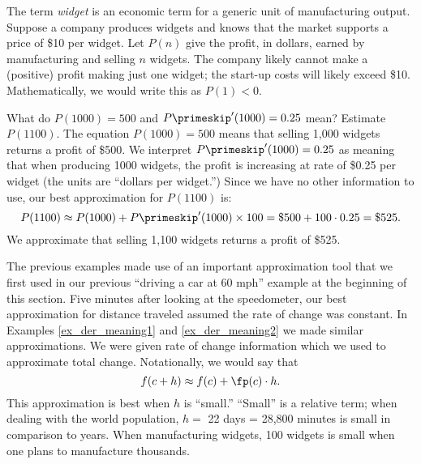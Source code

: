 \begin{example}\label{ex_der_meaning2}
The term \emph{widget} is an economic term for a generic unit of manufacturing output. Suppose a company produces widgets and knows that the market supports a price of \$10 per widget. Let $P(n)$ give the profit, in dollars, earned by manufacturing and selling $n$ widgets. The company likely cannot make a (positive) profit making just one widget; the start-up costs will likely exceed \$10. Mathematically, we would write this as $P(1) < 0$.

What do $P(1000) = 500$ and $P\primeskip'(1000)=0.25$ mean? Estimate $P(1100)$.
\solution
The equation $P(1000)=500$ means that selling 1,000 widgets returns a profit of \$500. We interpret $P\primeskip'(1000) = 0.25$ as meaning that when producing 1000 widgets, the profit is increasing at rate of \$0.25 per widget (the units are ``dollars per widget.'') Since we have no other information to use, our best approximation for $P(1100)$ is:
\[P(1100)\approx P(1000)+P\primeskip'(1000)\times100=\$500+100\cdot0.25=\$525.\]
We approximate that selling 1,100 widgets returns a profit of \$525.
\end{example}

The previous examples made use of an important approximation tool that we first used in our previous ``driving a car at 60 mph'' example at the beginning of this section. Five minutes after looking at the speedometer, our best approximation for distance traveled assumed the rate of change was constant. In Examples \ref{ex_der_meaning1} and \ref{ex_der_meaning2} we made similar approximations. We were given rate of change information which we used to approximate total change. Notationally, we would say that\vspace{-.2\baselineskip}
\[f(c+h) \approx f(c) + \fp(c)\cdot h.\]
This approximation is best when $h$ is ``small.'' ``Small'' is a relative term; when dealing with the world population, $h=$ 22 days = 28,800 minutes is small in comparison to years. When manufacturing widgets, 100 widgets is small when one plans to manufacture thousands.



